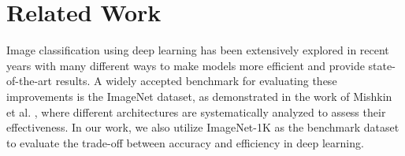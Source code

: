 \section{Related Work} \label{sec:related-work}





Image classification using deep learning has been extensively explored in recent years with many different ways to make models more efficient \cite{obaid2020deep} and provide state-of-the-art results. A widely accepted benchmark for evaluating these improvements is the ImageNet dataset, as demonstrated in the work of Mishkin et al. \cite{MISHKIN201711}, where different architectures are systematically analyzed to assess their effectiveness. In our work, we also utilize ImageNet-1K as the benchmark dataset to evaluate the trade-off between accuracy and efficiency in deep learning.

